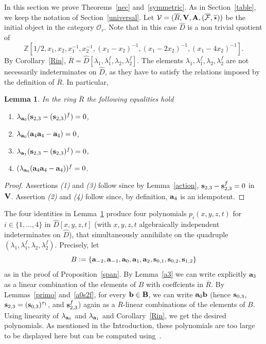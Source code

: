 \documentclass[a4paper]{amsart}
\newtheorem{lemma}{Lemma}[section]
\newcommand{\Amo}{{\mathcal {\bf A}}}
\newcommand{\Ro}{{\overline R}}
\newcommand{\Vo}{{\bf V}}
\newcommand{\Z}{{\mathbb Z}}
\newcommand{\ba}{{\bf a}}
\newcommand{\bs}{{\bf s}}
\begin{document}
In this section we prove Theorems~\ref{nec} and~\ref{symmetric}. As in Section~\ref{table}, we keep the notation of Section~\ref{universal}.
Let $\mathcal V=(\Ro,\Vo, \Amo, (\overline{\mathcal F}, \overline \star))$  be the initial object in the category $\mathcal O_r$. Note that in this case $\hat D$ is a non trivial quotient of 
$$\Z[1/2, x_1, x_2, x_1^{-1}, x_2^{-1}, (x_1-x_2)^{-1}, (x_1-2x_2)^{-1},(x_1-4x_2)^{-1}].
$$
By Corollary~\ref{Rin}, $\Ro=\hat D[\lambda_1, \lambda_1^f, \lambda_2, \lambda_2^f]$. The elements $\lambda_1, \lambda_1^f, \lambda_2, \lambda_2^f$ are not necessarily indeterminates on $\hat D$, as they have to satisfy the relations imposed by the definition of $\Ro$. In particular, 
\begin{lemma}\label{rels3}
In the ring $\Ro$ the following equalities hold
\begin{enumerate}
\item $\lambda_{\ba_0}(\bs_{2,3}-(\bs_{2,3})^f)=0$,
\item $\lambda_{\ba_0}(\ba_{4}\ba_4-\ba_4)=0$,%
\item $\lambda_{\ba_1}(\bs_{2,3}-(\bs_{2,3})^f)=0$,
\item $(\lambda_{\ba_0}(\ba_{4}\ba_4-\ba_4))^f=0$.
\end{enumerate}
\end{lemma}
\begin{proof}
Assertions {\it (1)} and {\it (3)} follow since by Lemma~\ref{action},  $\bs_{2,3}-\bs_{2,3}^f=0$ in $\Vo$. Assertion {\it (2)} and  {\it (4)} follow since, by definition, $\ba_4$ is an idempotent.
\end{proof}

The four identities in Lemma~\ref{rels3} produce four polynomials $p_i(x,y,z,t)$ for $i\in \{1, \ldots , 4\}$ in $\hat D [x,y,z,t]$ (with $x,y,z,t$ algebraically independent indeterminates on $\hat D$), that simultaneously annihilate on the quadruple $(\lambda_1, \lambda_1^f, \lambda_2, \lambda_2^f)$.  Precisely,  let 
$$B:=\{\ba_{-2}, \ba_{-1}, \ba_{0}, \ba_{1}, \ba_{2}, \bs_{0,1}, \bs_{0,2}, \bs_{1,2}\}
$$
as in the proof of Proposition~\ref{span}. By Lemma~\ref{a3} we can write explicitly $\ba_3$ as a linear combination of the elements of $B$ with coeffcients in $\Ro$. By Lemmas~\ref{primo} and~\ref{a0s2f}, for every $\bf b\in B$, we can write $\ba_0\bf b$ (hence $\bs_{0,3}$, $\bs_{2,3}=(\bs_{0,3})^{\tau_1}$, and $\bs_{2,3}^f$) again as a $\Ro$-linear combinations of the elements of $B$.  Using linearity of $\lambda_{\ba_0}$ and $\lambda_{\ba_1}$ and Corollary~\ref{Rin}, we get the desired polynomials. As mentioned in the Introduction, these polynomials are too large to be displayed here but can be computed using~\cite[genericsakuma.s]{code}.
\end{document}
